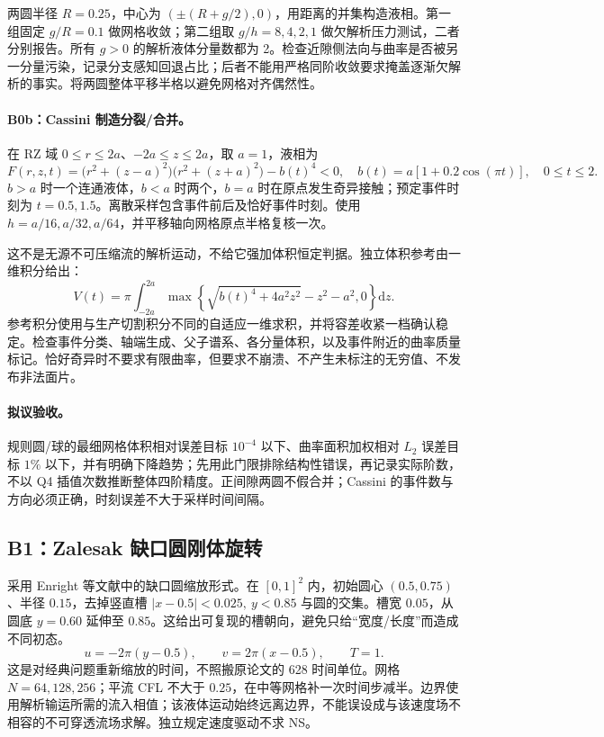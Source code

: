 \documentclass[11pt,a4paper]{article}
\newcommand{\dd}{\mathrm{d}}
\begin{document}
两圆半径 $R=0.25$，中心为 $(\pm(R+g/2),0)$，用距离的并集构造液相。第一组固定 $g/R=0.1$ 做网格收敛；第二组取 $g/h=8,4,2,1$ 做欠解析压力测试，二者分别报告。所有 $g>0$ 的解析液体分量数都为 2。检查近隙侧法向与曲率是否被另一分量污染，记录分支感知回退占比；后者不能用严格同阶收敛要求掩盖逐渐欠解析的事实。将两圆整体平移半格以避免网格对齐偶然性。

\paragraph{B0b：Cassini 制造分裂/合并。}
在 RZ 域 $0\leq r\leq2a$、$-2a\leq z\leq2a$，取 $a=1$，液相为
\begin{equation}
F(r,z,t)=\bigl(r^2+(z-a)^2\bigr)\bigl(r^2+(z+a)^2\bigr)-b(t)^4<0,
\quad b(t)=a[1+0.2\cos(\pi t)],\quad 0\leq t\leq2.
\end{equation}
$b>a$ 时一个连通液体，$b<a$ 时两个，$b=a$ 时在原点发生奇异接触；预定事件时刻为 $t=0.5,1.5$。离散采样包含事件前后及恰好事件时刻。使用 $h=a/16,a/32,a/64$，并平移轴向网格原点半格复核一次。

这不是无源不可压缩流的解析运动，不给它强加体积恒定判据。独立体积参考由一维积分给出：
\begin{equation}
V(t)=\pi\int_{-2a}^{2a}\max\left\{\sqrt{b(t)^4+4a^2z^2}-z^2-a^2,0\right\}\dd z.
\end{equation}
参考积分使用与生产切割积分不同的自适应一维求积，并将容差收紧一档确认稳定。检查事件分类、轴端生成、父子谱系、各分量体积，以及事件附近的曲率质量标记。恰好奇异时不要求有限曲率，但要求不崩溃、不产生未标注的无穷值、不发布非法面片。

\paragraph{拟议验收。}
规则圆/球的最细网格体积相对误差目标 $10^{-4}$ 以下、曲率面积加权相对 $L_2$ 误差目标 $1\%$ 以下，并有明确下降趋势；先用此门限排除结构性错误，再记录实际阶数，不以 Q4 插值次数推断整体四阶精度。正间隙两圆不假合并；Cassini 的事件数与方向必须正确，时刻误差不大于采样时间间隔。

\subsection{B1：Zalesak 缺口圆刚体旋转}
采用 Enright 等文献中的缺口圆缩放形式\cite{enright2002}。在 $[0,1]^2$ 内，初始圆心 $(0.5,0.75)$、半径 $0.15$，去掉竖直槽 $|x-0.5|<0.025,\ y<0.85$ 与圆的交集。槽宽 $0.05$，从圆底 $y=0.60$ 延伸至 $0.85$。这给出可复现的槽朝向，避免只给“宽度/长度”而造成不同初态。
\begin{equation}
u=-2\pi(y-0.5),\qquad v=2\pi(x-0.5),\qquad T=1.
\end{equation}
这是对经典问题重新缩放的时间，不照搬原论文的 628 时间单位。网格 $N=64,128,256$；平流 CFL 不大于 $0.25$，在中等网格补一次时间步减半。边界使用解析输运所需的流入相值；该液体运动始终远离边界，不能误设成与该速度场不相容的不可穿透流场求解。独立规定速度驱动不求 NS。
\end{document}
